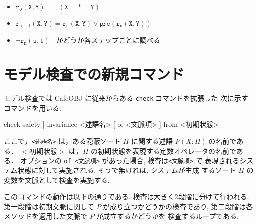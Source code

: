\begin{itemize}
\item $\mathtt{r_0(X,Y)=\neg(X{=}{*}{=}Y)}$
\item $\mathtt{r_{n+1}(X,Y)=r_n(X,Y)\vee pre(r_n(X,Y))}$
\item $\mathtt{\neg r_n(s,t)}$　かどうか各ステップごとに調べる
\end{itemize}

\section{モデル検査での新規コマンド}
\label{sec:model-check-new-command}

モデル検査では CafeOBJ に従来からある \texttt{check} コマンドを拡張した
次に示すコマンドを用いる:

\begin{vvtm}
\begin{simplev}
 check { safety | invariance } <述語名> [ of <文脈項> ] from <初期状態>
\end{simplev}
\end{vvtm}

ここで，\texttt{<述語名>} は，ある隠蔽ソート $H$ に関する述語
$P(X:H)$ の名前である．
$<$初期状態$>$ は，$H$ の初期状態を表現する定数オペレータの名前である．
オプションの \texttt{of <文脈項>} があった場合, 検査は\texttt{<文脈項>} で
表現されるシステム状態に対して実施される. そうで無ければ, システムが生成
するソート $H$ の変数を文脈として検査を実施する.

このコマンドの動作は以下の通りである.
検査は大きく2段階に分けて行われる.
第一段階は初期文脈に関して $P$ が成り立つかどうかの検査であり,
第二段階は各メソッドを適用した文脈で $P$ が成立するかどうかを
検査するループである.

